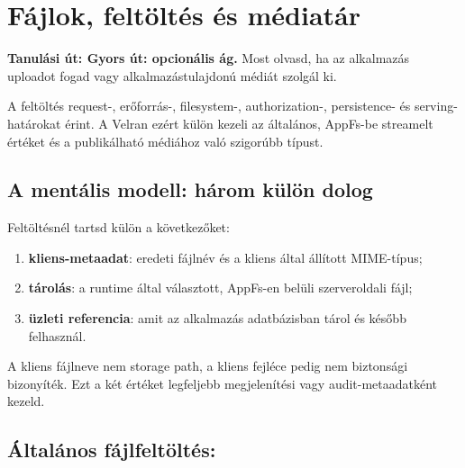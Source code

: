 \chapter{Fájlok, feltöltés és médiatár}

\noindent\textbf{Tanulási út: Gyors út: opcionális ág.} Most olvasd, ha az alkalmazás uploadot fogad vagy alkalmazástulajdonú médiát szolgál ki.\par\medskip



A feltöltés request-, erőforrás-, filesystem-, authorization-, persistence- és serving-határokat érint. A Velran ezért külön kezeli az általános, AppFs-be streamelt  értéket és a publikálható médiához való szigorúbb  típust.

\section{A mentális modell: három külön dolog}

Feltöltésnél tartsd külön a következőket:

\begin{enumerate}
  \item \textbf{kliens-metaadat}: eredeti fájlnév és a kliens által állított MIME-típus;
  \item \textbf{tárolás}: a runtime által választott, AppFs-en belüli szerveroldali fájl;
  \item \textbf{üzleti referencia}: amit az alkalmazás adatbázisban tárol és később felhasznál.
\end{enumerate}

A kliens fájlneve nem storage path, a kliens  fejléce pedig nem biztonsági bizonyíték. Ezt a két értéket legfeljebb megjelenítési vagy audit-metaadatként kezeld.

\section{Általános fájlfeltöltés: }


